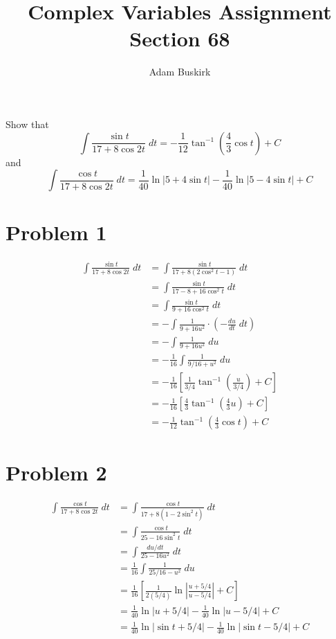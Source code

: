 \documentclass{article}
\title{Complex Variables Assignment Section 68}
\author{Adam Buskirk}
\theoremstyle{definition}
\newcommand{\p}[1]{\left(#1\right)}
\newcommand{\sq}[1]{\left[#1\right]}
\newcommand{\abs}[1]{\left|#1\right|}
\begin{document}
\maketitle

Show that 
\[
\int \frac{\sin t}{17+8 \cos 2 t} \;dt = -\frac{1}{12} \tan^{-1}\p{\frac{4}{3} \cos t} + C
\]
and
\[
\int \frac{\cos t}{17+8 \cos 2t} \;dt 
= \frac{1}{40} \ln \abs{5+4\sin t} - \frac{1}{40} \ln\abs{5-4\sin t} + C
\]

\section{Problem 1}
\begin{align*}
\int \frac{\sin t}{17+8\cos 2t} \;dt
&= \int \frac{\sin t}{17+8(2 \cos^2 t -1)} \;dt \\
&= \int \frac{\sin t}{17-8+16 \cos^2 t} \;dt \\
&= \int \frac{\sin t}{9 + 16 \cos^2 t} \;dt 
\tag{Sub.\ $u(t)=\cos t$, $u'(t) = -\sin t$}\\
&= - \int \frac{1}{9+16 u^2} \cdot \p{-\frac{du}{dt} \;dt} \\
&= - \int \frac{1}{9+16 u^2} \;du \\
&= - \frac{1}{16} \int \frac{1}{9/16 + u^2} \;du \\
&= - \frac{1}{16} \sq{\frac{1}{3/4} \tan^{-1}\p{\frac{u}{3/4}}+C} \\
&= - \frac{1}{16} \sq{\frac{4}{3} \tan^{-1}\p{\frac{4}{3} u} + C} \\
&= - \frac{1}{12} \tan^{-1}\p{\frac{4}{3} \cos t} + C
\end{align*}

\section{Problem 2}
\begin{align*}
\int \frac{\cos t}{17+8 \cos 2t} \;dt 
&= \int \frac{\cos t}{17+8(1-2\sin^2 t)} \;dt \\
&= \int \frac{\cos t}{25-16 \sin^2 t} \;dt \\
&= \int \frac{du/dt}{25-16u^2}\;dt \tag{$u=\sin t$, $du/dt=\cos t$} \\
&= \frac{1}{16} \int \frac{1}{25/16-u^2} \;du \\
&= \frac{1}{16} \sq{ \frac{1}{2(5/4)} \ln\abs{\frac{u+5/4}{u-5/4}}+C } \\
&= \frac{1}{40} \ln\abs{u+5/4} - \frac{1}{40} \ln\abs{u-5/4} + C \\
&= \frac{1}{40} \ln\abs{\sin t +5/4} - \frac{1}{40} \ln\abs{\sin t-5/4} + C
\end{align*}
\end{document}
